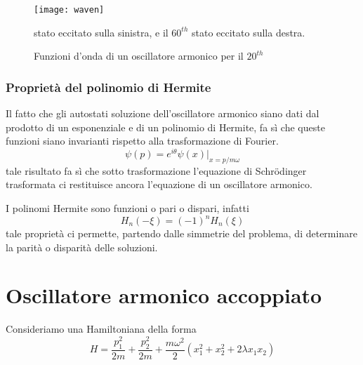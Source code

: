  
\begin{figure}[!ht]
\vspace{0.1in}
\texttt{[image: waven]}	
\centering
\vspace{0.1in}
\caption{Funzioni d'onda di un oscillatore armonico per il $20^{th}$} stato eccitato sulla sinistra, e il $60^{th}$ stato eccitato sulla destra.
\end{figure}

\subsubsection{Propriet\`a del polinomio di Hermite }

Il fatto che gli autostati soluzione dell'oscillatore armonico siano dati dal prodotto di un esponenziale e di un polinomio di Hermite, fa s\`i che queste funzioni siano invarianti rispetto alla trasformazione di Fourier. 
\begin{equation*}
	\psi(p) = e^{i \theta}\psi(x)|_{x = p /m\omega}
\end{equation*}
tale risultato fa s\`i che sotto trasformazione l'equazione di Schr\"odinger trasformata ci restituisce ancora l'equazione di un oscillatore armonico.

I polinomi Hermite sono funzioni o pari o dispari, infatti 
\begin{equation*}
	H_n(-\xi) = (-1)^n H_{n}(\xi)
\end{equation*}
tale propriet\`a ci permette, partendo dalle simmetrie del problema, di determinare la parit\`a o disparit\`a delle soluzioni. 

\section{Oscillatore armonico accoppiato}

Consideriamo una Hamiltoniana della forma 
\begin{equation*}
	H = \frac{p_1^2}{2m} + \frac{p_2^2}{2m} + \frac{m \omega^2}{2}(x_1^2 + x_2^2 + 2 \lambda x_1 x_2)
\end{equation*}


